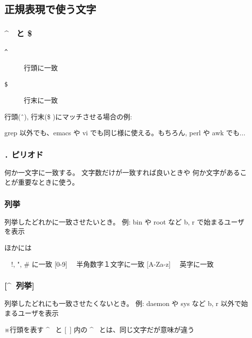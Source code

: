 \documentclass[mingoth,a4paper]{jsarticle}
\begin{document}
\subsection{正規表現で使う文字}
\subsubsection{ \^ ~と \$}
\begin{description}
      \item[{\tt \^}] 行頭に一致
      \item[{\tt \$}] 行末に一致
\end{description}
行頭(\^\ ), 行末(\$ )にマッチさせる場合の例:
\begin{commandline}
\end{commandline}
grep 以外でも、emacs や vi でも同じ様に使える。もちろん, perl や awk でも...

\subsubsection{{\tt .} ピリオド}

何か一文字に一致する。
文字数だけが一致すれば良いときや
何か文字があることが重要なときに使う。

\subsubsection{列挙}

列挙したどれかに一致させたいとき。
例: bin や root など b, r で始まるユーザを表示
\begin{commandline}
\end{commandline}
ほかには
\begin{commandline}
[! " \# ] 　!, ", \# に一致
[0-9] 　半角数字１文字に一致
[A-Za-z] 　英字に一致
\end{commandline}

\subsubsection{[\^~列挙]}

列挙したどれにも一致させたくないとき。
例: daemon や sys など b, r 以外で始まるユーザを表示 
\begin{commandline}
\end{commandline}
※行頭を表す \^~ と [~] 内の \^~ とは、同じ文字だが意味が違う
\end{document}
